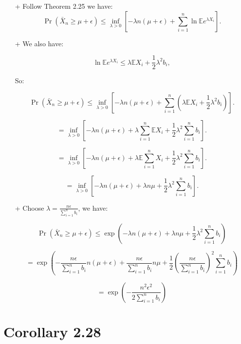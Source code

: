\begin{itemize}
    \item[+] Follow Theorem 2.25 we have:
    \[
    \Pr(\bar{X}_n \geq \mu + \epsilon) \leq \inf_{\lambda>0} 
    \left[ -\lambda n(\mu + \epsilon) + \sum_{i=1}^n \ln \mathbb{E} e^{\lambda X_i} \right].
    \]

    \item[+] We also have: 
    
    \[
    \ln \mathbb{E} e^{\lambda X_i} \leq \lambda \mathbb{E} X_i + \frac{1}{2} \lambda^2 b_i,
    \]
    
    So:

    \[
    \Pr(\bar{X}_n \geq \mu + \epsilon) \leq \inf_{\lambda>0} 
    \left[ -\lambda n(\mu + \epsilon) + \sum_{i=1}^n (\lambda \mathbb{E} X_i + \frac{1}{2} \lambda^2 b_i) \right].
    \]

    \[
    = \inf_{\lambda>0} 
    \left[ -\lambda n(\mu + \epsilon) + \lambda \sum_{i=1}^n  \mathbb{E} X_i + \frac{1}{2} \lambda^2 \sum_{i=1}^n b_i \right].
    \]

    \[
    = \inf_{\lambda>0} 
    \left[ -\lambda n(\mu + \epsilon) + \lambda \mathbb{E} \sum_{i=1}^n X_i + \frac{1}{2} \lambda^2 \sum_{i=1}^nb_i \right].
    \]

    \[
    = \inf_{\lambda>0} 
    \left[ -\lambda n(\mu + \epsilon) + \lambda n \mu + \frac{1}{2} \lambda^2 \sum_{i = 1}^{n} b_i \right].
    \]
    
    \item[+] Choose $\lambda = \frac{n\epsilon}{\sum_{i = 1}^{n}b_i}$, we have:

    
    \[
    \Pr(\bar{X}_n \geq \mu + \epsilon) \leq \exp(-\lambda n(\mu + \epsilon) + \lambda n \mu + \frac{1}{2} \lambda^2 \sum_{i=1}^n b_i)
    \]

     \[
    = \exp(-\frac{n\epsilon}{\sum_{i = 1}^{n}b_i} n(\mu + \epsilon) + \frac{n\epsilon}{\sum_{i = 1}^{n}b_i} n \mu + \frac{1}{2} (\frac{n\epsilon}{\sum_{i = 1}^{n}b_i})^2 \sum_{i=1}^n b_i)
    \]

    \[
    = \exp( -\frac{n^2\epsilon^2}{2\sum_{i = 1}^{n}b_i})
    \]

    
\end{itemize}

\section{Corollary 2.28}

